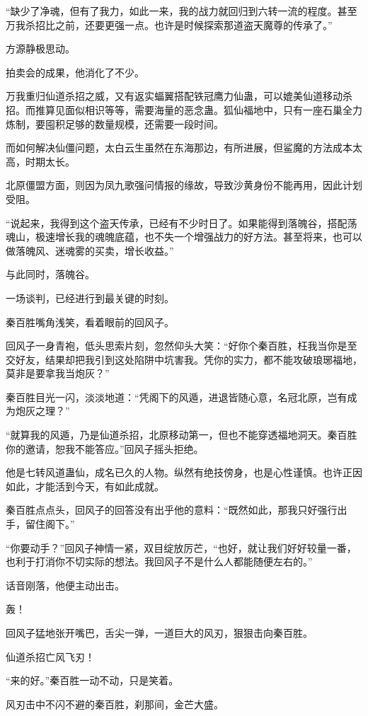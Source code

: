 \begin{this_body}
“缺少了净魂，但有了我力，如此一来，我的战力就回归到六转一流的程度。甚至万我杀招比之前，还要更强一点。也许是时候探索那道盗天魔尊的传承了。”

方源静极思动。

拍卖会的成果，他消化了不少。

万我重归仙道杀招之威，又有返实蝠翼搭配铁冠鹰力仙蛊，可以媲美仙道移动杀招。而推算见面似相识等等，需要海量的恶念蛊。狐仙福地中，只有一座石巢全力炼制，要囤积足够的数量规模，还需要一段时间。

而如何解决仙僵问题，太白云生虽然在东海那边，有所进展，但鲨魔的方法成本太高，时期太长。

北原僵盟方面，则因为凤九歌强问情报的缘故，导致沙黄身份不能再用，因此计划受阻。

“说起来，我得到这个盗天传承，已经有不少时日了。如果能得到落魄谷，搭配荡魂山，极速增长我的魂魄底蕴，也不失一个增强战力的好方法。甚至将来，也可以做落魄风、迷魂雾的买卖，增长收益。”

与此同时，落魄谷。

一场谈判，已经进行到最关键的时刻。

秦百胜嘴角浅笑，看着眼前的回风子。

回风子一身青袍，低头思索片刻，忽然仰头大笑：“好你个秦百胜，枉我当你是至交好友，结果却把我引到这处陷阱中坑害我。凭你的实力，都不能攻破琅琊福地，莫非是要拿我当炮灰？”

秦百胜目光一闪，淡淡地道：“凭阁下的风遁，进退皆随心意，名冠北原，岂有成为炮灰之理？”

“就算我的风遁，乃是仙道杀招，北原移动第一，但也不能穿透福地洞天。秦百胜你的邀请，恕我不能答应。”回风子摇头拒绝。

他是七转风道蛊仙，成名已久的人物。纵然有绝技傍身，也是心性谨慎。也许正因如此，才能活到今天，有如此成就。

秦百胜点点头，回风子的回答没有出乎他的意料：“既然如此，那我只好强行出手，留住阁下。”

“你要动手？”回风子神情一紧，双目绽放厉芒，“也好，就让我们好好较量一番，也利于打消你不切实际的想法。我回风子不是什么人都能随便左右的。”

话音刚落，他便主动出击。

轰！

回风子猛地张开嘴巴，舌尖一弹，一道巨大的风刃，狠狠击向秦百胜。

仙道杀招亡风飞刃！

“来的好。”秦百胜一动不动，只是笑着。

风刃击中不闪不避的秦百胜，刹那间，金芒大盛。


\end{this_body}
